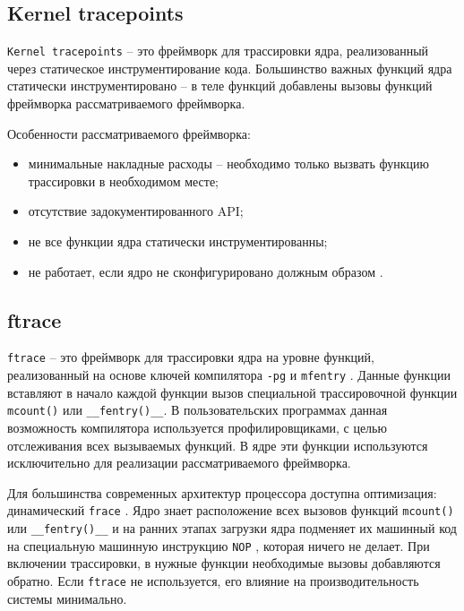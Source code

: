 \subsection{Kernel tracepoints}

\texttt{Kernel tracepoints} \cite{kernel-tracepoints} -- это фреймворк для трассировки ядра, реализованный через статическое инструментирование кода. Большинство важных функций ядра статически инструментировано -- в теле функций добавлены вызовы функций фреймворка рассматриваемого фреймворка.

Особенности рассматриваемого фреймворка:

\begin{itemize}
	\item минимальные накладные расходы -- необходимо только вызвать функцию трассировки в необходимом месте;
	\item отсутствие задокументированного API;
	\item не все функции ядра статически инструментированны; 
	\item не работает, если ядро не сконфигурировано должным образом \cite{habr-profiling-linux}.
\end{itemize}

\subsection{ftrace}

\texttt{ftrace} \cite{ftrace} -- это фреймворк для трассировки ядра на уровне функций, реализованный на основе ключей компилятора \texttt{-pg} \cite{ftrace-habr} и \texttt{mfentry} \cite{ftrace-habr}. Данные функции вставляют в начало каждой функции вызов специальной трассировочной функции \texttt{mcount()} или \texttt{\_\_fentry()\_\_}. В пользовательских программах данная возможность компилятора используется профилировщиками, с целью отслеживания всех вызываемых функций. В ядре эти функции используются исключительно для реализации рассматриваемого фреймворка.

Для большинства современных архитектур процессора доступна оптимизация: динамический \texttt{frace} \cite{ftrace-habr}. Ядро знает расположение всех вызовов функций \texttt{mcount()} или \texttt{\_\_fentry()\_\_} и на ранних этапах загрузки ядра подменяет их машинный код на специальную машинную инструкцию \texttt{NOP} \cite{NOP}, которая ничего не делает. При включении трассировки, в нужные функции необходимые вызовы добавляются обратно. Если \texttt{ftrace} не используется, его влияние на производительность системы минимально.


